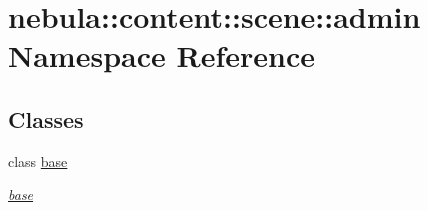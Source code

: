 \hypertarget{namespacenebula_1_1content_1_1scene_1_1admin}{
\section{nebula::content::scene::admin Namespace Reference}
\label{namespacenebula_1_1content_1_1scene_1_1admin}
}
\subsection*{Classes}
\begin{DoxyCompactItemize}
\item 
class \hyperlink{classnebula_1_1content_1_1scene_1_1admin_1_1base}{base}
\begin{DoxyCompactList}\small\item\em \hyperlink{classnebula_1_1content_1_1scene_1_1admin_1_1base}{base} \item\end{DoxyCompactList}\end{DoxyCompactItemize}
